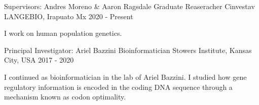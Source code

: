 

\begin{cventries}


 \cventry
        {Supervisors: Andres Moreno \& Aaron Ragsdale} %
        {Graduate Reaseracher} %
        {Cinvestav LANGEBIO, Irapuato Mx} %
        {2020 - Present} %
        {
          \begin{cvitems} %
            \item {
            \begin{flushleft}
            I work on human population genetics.
          \end{flushleft}
            }
          \end{cvitems}
        }

 \cventry
        {Principal Investigator: Ariel Bazzini} %
        {Bioinformatician} %
        {Stowers Institute, Kansas City, USA} %
        {2017 - 2020} %
        {
          \begin{cvitems} %
            \item {
            \begin{flushleft}
            I continued as bioinformatician in the lab of Ariel Bazzini. I studied how gene regulatory information is encoded in the coding DNA sequence 
            through a mechanism known as codon optimality.
          \end{flushleft}
            }
          \end{cvitems}
        }


\end{cventries}
